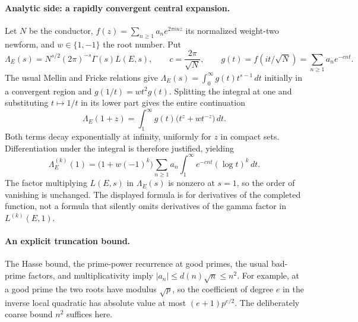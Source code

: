 \documentclass[11pt]{article}
\begin{document}
\paragraph{Analytic side: a rapidly convergent central expansion.}
Let $N$ be the conductor, $f(z)=\sum_{n\ge1}a_ne^{2\pi inz}$ its
normalized weight-two newform, and $w\in\{1,-1\}$ the root number. Put
\[
 \Lambda_E(s)=N^{s/2}(2\pi)^{-s}\Gamma(s)L(E,s),\qquad
 c=\frac{2\pi}{\sqrt N},\qquad
 g(t)=f(it/\sqrt N)=\sum_{n\ge1}a_ne^{-cnt}.
\]
The usual Mellin and Fricke relations give
$\Lambda_E(s)=\int_0^\infty g(t)t^{s-1}\,dt$ initially in a convergent
region and $g(1/t)=wt^2g(t)$. Splitting the integral at one and substituting
$t\mapsto1/t$ in its lower part gives the entire continuation
\begin{equation}\label{cont6:mellin}
 \Lambda_E(1+z)
   =\int_1^\infty g(t)\bigl(t^z+wt^{-z}\bigr)\,dt.
\end{equation}
Both terms decay exponentially at infinity, uniformly for $z$ in compact
sets. Differentiation under the integral is therefore justified, yielding
\begin{equation}\label{cont6:derivative}
 \Lambda_E^{(k)}(1)
  =\bigl(1+w(-1)^k\bigr)
     \sum_{n\ge1}a_n\int_1^\infty e^{-cnt}(\log t)^k\,dt.
\end{equation}
The factor multiplying $L(E,s)$ in $\Lambda_E(s)$ is nonzero at $s=1$,
so the order of vanishing is unchanged. The displayed formula is for
derivatives of the completed function, not a formula that silently omits
derivatives of the gamma factor in $L^{(k)}(E,1)$.

\paragraph{An explicit truncation bound.}
The Hasse bound, the prime-power recurrence at good primes, the usual
bad-prime factors, and multiplicativity imply
$|a_n|\le d(n)\sqrt n\le n^2$. For example, at a good prime the two
roots have modulus $\sqrt p$, so the coefficient of degree $e$ in the
inverse local quadratic has absolute value at most $(e+1)p^{e/2}$.
The deliberately coarse bound $n^2$ suffices here.
\end{document}
